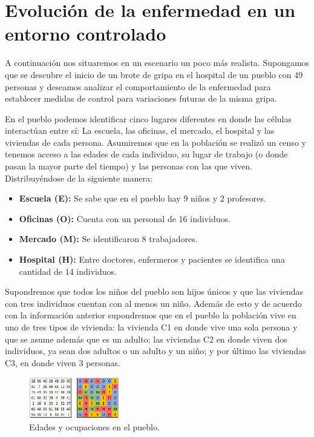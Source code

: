 \chapter{Evolución de la enfermedad en un entorno controlado}

A continuación nos situaremos en un escenario un poco más realista. Supongamos que se descubre el inicio de un brote de gripa en el hospital de un pueblo con 49 personas y deseamos analizar el comportamiento de la enfermedad para establecer medidas de control para variaciones futuras de la misma gripa.

En el pueblo podemos identificar cinco lugares diferentes en donde las células interactúan entre sí: La escuela, las oficinas, el mercado, el hospital y las viviendas de cada persona. Asumiremos que en la población se realizó un censo y tenemos acceso a las edades de cada individuo, su lugar de trabajo (o donde pasan la mayor parte del tiempo) y las personas con las que viven. Distribuyéndose de la siguiente manera:

\begin{itemize}
    \item \textbf{Escuela (E):} Se sabe que en el pueblo hay 9 niños y 2 profesores.
    \item \textbf{Oficinas (O):} Cuenta con un personal de 16 individuos.
    \item \textbf{Mercado (M):} Se identificaron 8 trabajadores.
    \item \textbf{Hospital (H):} Entre doctores, enfermeros y pacientes se identifica una cantidad de 14 individuos.
\end{itemize}

Supondremos que todos los niños del pueblo son hijos únicos y que las viviendas con tres individuos cuentan con al menos un niño. Además de esto y de acuerdo con la información anterior supondremos que en el pueblo la población vive en uno de tres tipos de vivienda: la vivienda C1 en donde vive una sola persona y que se asume además que es un adulto; las viviendas C2 en donde viven dos individuos, ya sean dos adultos o un adulto y un niño; y por último las viviendas C3, en donde viven 3 personas.

\begin{figure}[h]\label{fig:edadesYOcupaciones}
  \centering
    \includegraphics[width=0.3525\textwidth]{Imagenes/edadesYOcupaciones.PNG}
    \caption{Edades y ocupaciones en el pueblo.}
\end{figure}

